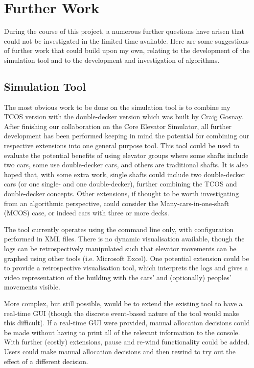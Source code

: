 \documentclass{UoYCSproject}
\begin{document}
\section{Further Work}

During the course of this project, a numerous further questions have arisen that could not be investigated in the limited time available.  Here are some suggestions of further work that could build upon my own, relating to the development of the simulation tool and to the development and investigation of algorithms.

\subsection{Simulation Tool}

The most obvious work to be done on the simulation tool is to combine my TCOS version with the double-decker version which was built by Craig Gosnay.  After finishing our collaboration on the Core Elevator Simulator, all further development has been performed keeping in mind the potential for combining our respective extensions into one general purpose tool.  This tool could be used to evaluate the potential benefits of using elevator groups where some shafts include two cars, some use double-decker cars, and others are traditional shafts.  It is also hoped that, with some extra work, single shafts could include two double-decker cars (or one single- and one double-decker), further combining the TCOS and double-decker concepts.  Other extensions, if thought to be worth investigating from an algorithmic perspective, could consider the Many-cars-in-one-shaft (MCOS) case, or indeed cars with three or more decks.

The tool currently operates using the command line only, with configuration performed in XML files.  There is no dynamic visualisation available, though the logs can be retrospectively manipulated such that elevator movements can be graphed using other tools (i.e. Microsoft Excel).  One potential extension could be to provide a retrospective visualisation tool, which interprets the logs and gives a video representation of the building with the cars' and (optionally) peoples' movements visible.

More complex, but still possible, would be to extend the existing tool to have a real-time GUI (though the discrete event-based nature of the tool would make this difficult).  If a real-time GUI were provided, manual allocation decisions could be made without having to print all of the relevant information to the console.  With further (costly) extensions, pause and re-wind functionality could be added.  Users could make manual allocation decisions and then rewind to try out the effect of a different decision.
\end{document}
